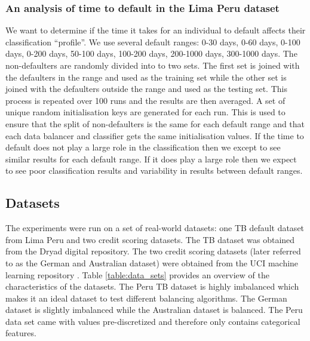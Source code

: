\documentclass{sig-alternate-05-2015}
\begin{document}
	\subsubsection{An analysis of time to default in the Lima Peru dataset}
	We want to determine if the time it takes for an individual to default affects their classification ``profile''. We use several default ranges: 0-30 days, 0-60 days, 0-100 days, 0-200 days, 50-100 days, 100-200 days, 200-1000 days, 300-1000 days. The non-defaulters are randomly divided into to two sets. The first set is joined with the defaulters in the range and used as the training set while the other set is joined with the defaulters outside the range and used as the testing set. This process is repeated over 100 runs and the results are then averaged. A set of unique random initialisation keys are generated for each run. This is used to ensure that the split of non-defaulters is the same for each default range and that each data balancer and classifier gets the same initialisation values. If the time to default does not play a large role in the classification then we except to see similar results for each default range. If it does play a large role then we expect to see poor classification results and variability in results between default ranges.
	
	
	\subsection{Datasets}
	The experiments were run on a set of real-world datasets: one TB default dataset from Lima Peru \cite{Lackey:10356751520150601} and two credit scoring datasets. The TB dataset was obtained from the Dryad digital repository. The two credit scoring datasets (later referred to as the German and Australian dataset) were obtained from the UCI machine learning repository \cite{Lichman:2013}. Table \ref{table:data_sets} provides an overview of the characteristics of the datasets. The Peru TB dataset is highly imbalanced which makes it an ideal dataset to test different balancing algorithms. The German dataset is slightly imbalanced while the Australian dataset is balanced. The Peru data set came with values pre-discretized and therefore only contains categorical features.
	\begin{table}
		\centering
		\caption{Data set summary}
		\label{table:data_sets}
	\end{table}
\end{document}
